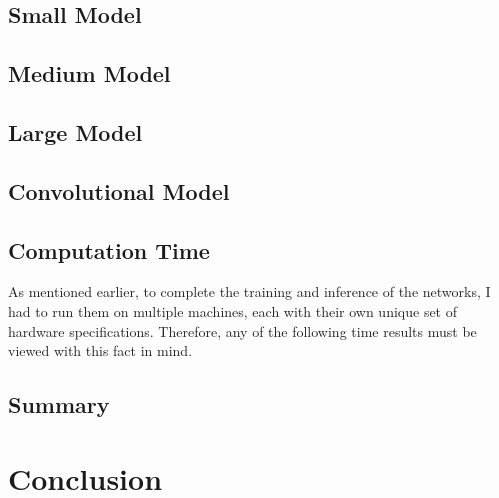 \documentclass[pageno]{jpaper}
\begin{document}
\subsection{Small Model}

\subsection{Medium Model}

\subsection{Large Model}

\subsection{Convolutional Model}

\subsection{Computation Time}
As mentioned earlier, to complete the training and inference of the networks, I had to run them on multiple machines, each with their own unique set of hardware specifications.  Therefore, any of the following time results must be viewed with this fact in mind.
\subsection{Summary}

\section{Conclusion}
\end{document}
